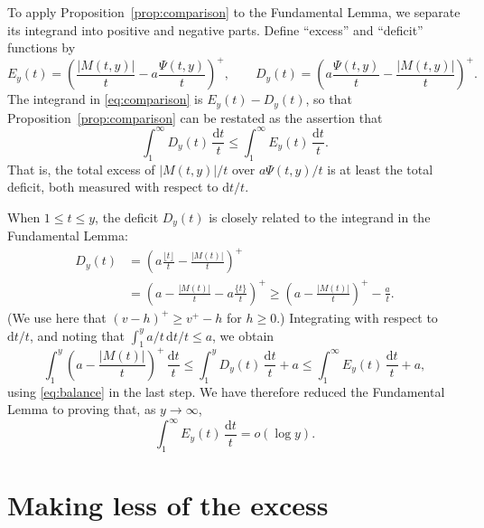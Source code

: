 \documentclass[11pt]{amsart}
\theoremstyle{remark}
\newcommand{\dt}{\,\frac{\mathrm{d}t}{t}}
\newcommand{\pos}[1]{\left(#1\right)^+}
\begin{document}
To apply Proposition~\ref{prop:comparison} to the Fundamental Lemma,
we separate its integrand into positive and negative parts. Define ``excess'' and ``deficit'' functions by
\[
E_y(t)=\pos{\frac{|M(t,y)|}t-a\frac{\Psi(t,y)}t},
\qquad
D_y(t)=\pos{a\frac{\Psi(t,y)}t-\frac{|M(t,y)|}t}.
\]
The integrand in \eqref{eq:comparison} is $E_y(t)-D_y(t)$, so that Proposition~\ref{prop:comparison} can be restated as the assertion that
\begin{equation}\label{eq:balance}
\int_1^\infty D_y(t)\dt\le\int_1^\infty E_y(t)\dt.
\end{equation}
That is, the total excess of $|M(t,y)|/t$ over $a\Psi(t,y)/t$ is at least the total deficit, both measured with respect to $\mathrm{d}t/t$.

When $1\le t\le y$, the deficit $D_y(t)$ is closely related to the integrand in the Fundamental Lemma:
\[
\begin{aligned}
D_y(t)
&=\pos{a\frac{\lfloor t\rfloor}t-\frac{|M(t)|}t}\\
&=\pos{a-\frac{|M(t)|}t-a\frac{\{t\}}t}
\ge\pos{a-\frac{|M(t)|}t}-\frac at.
\end{aligned}
\]
(We use here that $(v-h)^+\ge v^+-h$ for $h\ge0$.) Integrating with respect to $\mathrm{d}t/t$, and noting that $\int_1^{y} a/t\,\mathrm{d}t/t \le a$, we obtain
\begin{equation*}
\int_1^y\pos{a-\frac{|M(t)|}t}\dt
\le\int_1^yD_y(t)\dt+a
\le\int_1^\infty E_y(t)\dt+a,
\end{equation*}
using \eqref{eq:balance} in the last step.
We have therefore reduced the Fundamental Lemma to proving that,
as $y\to\infty$,
\begin{equation}\label{eq:excess-goal}
\int_1^\infty E_y(t)\dt=o(\log y).
\end{equation}

\section{Making less of the excess}\label{sec:excess}
\end{document}

